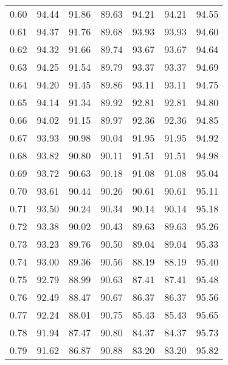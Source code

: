 \begin{tabular}{|c|c|c|c|c|c|c|}
      0.60 &     94.44 &     91.86 &      89.63 &   94.21 &      94.21 &         94.55 \\
      0.61 &     94.37 &     91.76 &      89.68 &   93.93 &      93.93 &         94.60 \\
      0.62 &     94.32 &     91.66 &      89.74 &   93.67 &      93.67 &         94.64 \\
      0.63 &     94.25 &     91.54 &      89.79 &   93.37 &      93.37 &         94.69 \\
      0.64 &     94.20 &     91.45 &      89.86 &   93.11 &      93.11 &         94.75 \\
      0.65 &     94.14 &     91.34 &      89.92 &   92.81 &      92.81 &         94.80 \\
      0.66 &     94.02 &     91.15 &      89.97 &   92.36 &      92.36 &         94.85 \\
      0.67 &     93.93 &     90.98 &      90.04 &   91.95 &      91.95 &         94.92 \\
      0.68 &     93.82 &     90.80 &      90.11 &   91.51 &      91.51 &         94.98 \\
      0.69 &     93.72 &     90.63 &      90.18 &   91.08 &      91.08 &         95.04 \\
      0.70 &     93.61 &     90.44 &      90.26 &   90.61 &      90.61 &         95.11 \\
      0.71 &     93.50 &     90.24 &      90.34 &   90.14 &      90.14 &         95.18 \\
      0.72 &     93.38 &     90.02 &      90.43 &   89.63 &      89.63 &         95.26 \\
      0.73 &     93.23 &     89.76 &      90.50 &   89.04 &      89.04 &         95.33 \\
      0.74 &     93.00 &     89.36 &      90.56 &   88.19 &      88.19 &         95.40 \\
      0.75 &     92.79 &     88.99 &      90.63 &   87.41 &      87.41 &         95.48 \\
      0.76 &     92.49 &     88.47 &      90.67 &   86.37 &      86.37 &         95.56 \\
      0.77 &     92.24 &     88.01 &      90.75 &   85.43 &      85.43 &         95.65 \\
      0.78 &     91.94 &     87.47 &      90.80 &   84.37 &      84.37 &         95.73 \\
      0.79 &     91.62 &     86.87 &      90.88 &   83.20 &      83.20 &         95.82 \\

\end{tabular}
